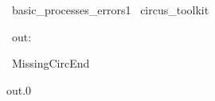 
\begin{zsection}
  \SECTION\ basic\_processes\_errors1 \parents\ circus\_toolkit
\end{zsection}

\begin{circus}
    \circchannel\ out: \nat
\end{circus}


\begin{circus}
    \circprocess\ MissingCircEnd ~~\circdef~~ \circbegin
\end{circus}

\begin{circusaction}
    \circspot out.0 \then \Skip
\end{circusaction}

